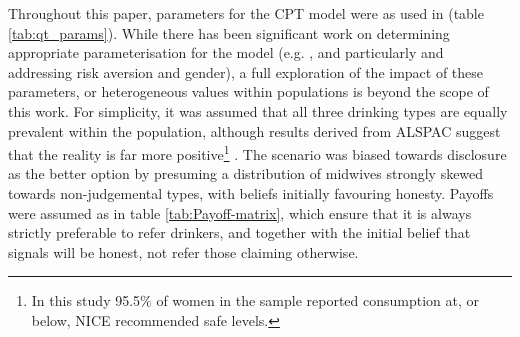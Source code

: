 Throughout this paper, parameters for the \ac{CPT} model were as used in \cite{Tversky1992} (table \ref{tab:qt_params}). While there has been significant work on determining appropriate parameterisation for the model (e.g. \cite{Neilson2002,Nilsson2011,Glockner2012}, and particularly \citet{Byrnes1999} and \citet{Booij2009} addressing risk aversion and gender), a full exploration of the impact of these parameters, or heterogeneous values within populations is beyond the scope of this work. For simplicity, it was assumed that all three drinking types are equally prevalent within the population, although results derived from \acl{ALSPAC} suggest that the reality is far more positive\footnote{In this study 95.5\% of women in the sample reported consumption at, or below, \ac{NICE} recommended safe levels.} \citep{Humphriss2013}. The scenario was biased towards disclosure as the better option by presuming a distribution of midwives strongly skewed towards non-judgemental types, with beliefs initially favouring honesty. Payoffs were assumed as in table \ref{tab:Payoff-matrix}, which ensure that it is always strictly preferable to refer drinkers, and together with the initial belief that signals will be honest, not refer those claiming otherwise.

